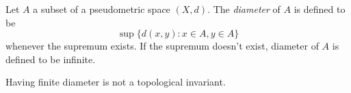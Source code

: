 \documentclass{article}
\begin{document}
Let $A$ a subset of a pseudometric space $(X,d)$. The \emph{diameter} of $A$ is defined to be
$$\sup\{d(x,y) : x\in A, y\in A\}$$
whenever the supremum exists. If the supremum doesn't exist, diameter of $A$ is defined to be infinite.

Having finite diameter is not a topological invariant.
\end{document}
